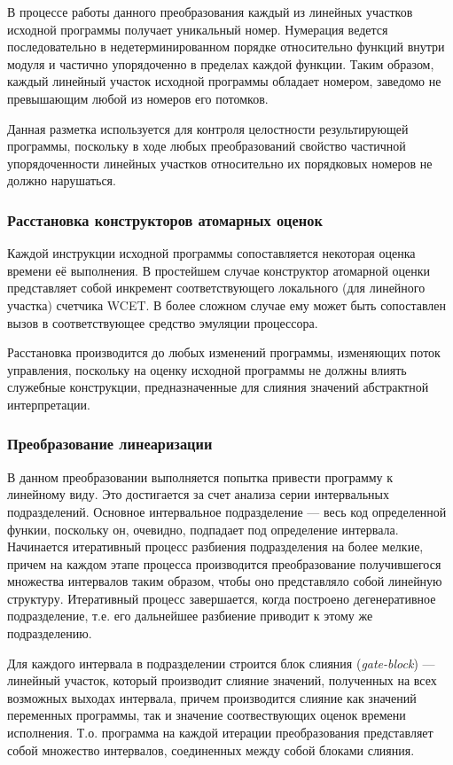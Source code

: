 \documentclass[12pt,a4paper]{article}
\begin{document}
В процессе работы данного преобразования каждый из линейных участков исходной программы получает уникальный номер. Нумерация ведется последовательно в недетерминированном порядке относительно функций внутри модуля и частично упорядоченно в пределах каждой функции. Таким образом, каждый линейный участок исходной программы обладает номером, заведомо не превышающим любой из номеров его потомков. 

Данная разметка используется для контроля целостности результирующей программы, поскольку в ходе любых преобразований свойство частичной упорядоченности линейных участков относительно их порядковых номеров не должно нарушаться.

\subsubsection{Расстановка конструкторов атомарных оценок}

Каждой инструкции исходной программы сопоставляется некоторая оценка времени её выполнения. В простейшем случае конструктор атомарной оценки представляет собой инкремент соответствующего локального (для линейного участка) счетчика WCET. В более сложном случае ему может быть сопоставлен вызов в соответствующее средство эмуляции процессора. 

Расстановка производится до любых изменений программы, изменяющих поток управления, поскольку на оценку исходной программы не должны влиять служебные конструкции, предназначенные для слияния значений абстрактной интерпретации.

\subsubsection{Преобразование линеаризации}

В данном преобразовании выполняется попытка привести программу к линейному виду. Это достигается за счет анализа серии интервальных подразделений. Основное интервальное подразделение --- весь код определенной функии, поскольку он, очевидно, подпадает под определение интервала. Начинается итеративный процесс разбиения подразделения на более мелкие, причем на каждом этапе процесса производится преобразование получившегося множества интервалов таким образом, чтобы оно представляло собой линейную структуру. Итеративный процесс завершается, когда построено дегенеративное подразделение, т.е. его дальнейшее разбиение приводит к этому же подразделению.

Для каждого интервала в подразделении строится блок слияния (\textit{gate-block}) --- линейный участок, который производит слияние значений, полученных на всех возможных выходах интервала, причем производится слияние как значений переменных программы, так и значение соотвествующих оценок времени исполнения. Т.о. программа на каждой итерации преобразования представляет собой множество интервалов, соединенных между собой блоками слияния.
\end{document}
